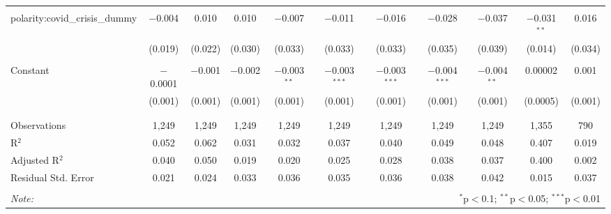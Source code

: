 \begin{table}[!htbp]
\begin{adjustbox}{width=1.25\textwidth}
\begin{tabular}{@{\extracolsep{5pt}}lcccccccccc}
  & & & & & & & & & & \\ 
 polarity:covid\_crisis\_dummy & $-$0.004 & 0.010 & 0.010 & $-$0.007 & $-$0.011 & $-$0.016 & $-$0.028 & $-$0.037 & $-$0.031$^{**}$ & 0.016 \\ 
  & (0.019) & (0.022) & (0.030) & (0.033) & (0.033) & (0.033) & (0.035) & (0.039) & (0.014) & (0.034) \\ 
  & & & & & & & & & & \\ 
 Constant & $-$0.0001 & $-$0.001 & $-$0.002 & $-$0.003$^{**}$ & $-$0.003$^{***}$ & $-$0.003$^{***}$ & $-$0.004$^{***}$ & $-$0.004$^{**}$ & 0.00002 & 0.001 \\ 
  & (0.001) & (0.001) & (0.001) & (0.001) & (0.001) & (0.001) & (0.001) & (0.001) & (0.0005) & (0.001) \\ 
  & & & & & & & & & & \\ 
\hline \\[-1.8ex] 
Observations & 1,249 & 1,249 & 1,249 & 1,249 & 1,249 & 1,249 & 1,249 & 1,249 & 1,355 & 790 \\ 
R$^{2}$ & 0.052 & 0.062 & 0.031 & 0.032 & 0.037 & 0.040 & 0.049 & 0.048 & 0.407 & 0.019 \\ 
Adjusted R$^{2}$ & 0.040 & 0.050 & 0.019 & 0.020 & 0.025 & 0.028 & 0.038 & 0.037 & 0.400 & 0.002 \\ 
Residual Std. Error & 0.021 & 0.024 & 0.033 & 0.036 & 0.035 & 0.036 & 0.038 & 0.042 & 0.015 & 0.037 \\ 
\hline 
\hline \\[-1.8ex] 
\textit{Note:}  & \multicolumn{10}{r}{$^{*}$p$<$0.1; $^{**}$p$<$0.05; $^{***}$p$<$0.01} \\ 
\end{tabular} 
\end{adjustbox} 
\end{table} 
